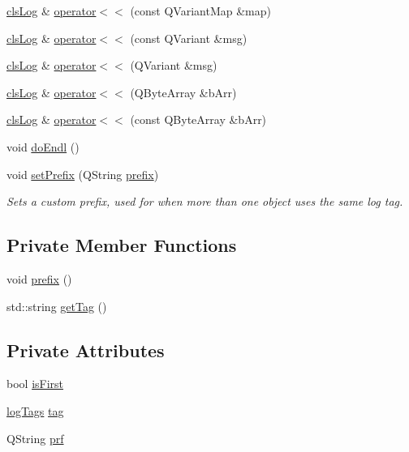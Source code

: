 \begin{DoxyCompactItemize}
\item 
\hyperlink{class_k4_u_1_1cls_log}{cls\-Log} \& \hyperlink{class_k4_u_1_1cls_log_ad3c6cb4ff134f40925f8d19177a461b6}{operator$<$$<$} (const Q\-Variant\-Map \&map)
\item 
\hyperlink{class_k4_u_1_1cls_log}{cls\-Log} \& \hyperlink{class_k4_u_1_1cls_log_a667d8d0b430593af7caf563410214187}{operator$<$$<$} (const Q\-Variant \&msg)
\item 
\hyperlink{class_k4_u_1_1cls_log}{cls\-Log} \& \hyperlink{class_k4_u_1_1cls_log_a99d9c23284e9bb462858f4d6ca33a93a}{operator$<$$<$} (Q\-Variant \&msg)
\item 
\hyperlink{class_k4_u_1_1cls_log}{cls\-Log} \& \hyperlink{class_k4_u_1_1cls_log_a265b09c82c550e8957f29724ec0d1198}{operator$<$$<$} (Q\-Byte\-Array \&b\-Arr)
\item 
\hyperlink{class_k4_u_1_1cls_log}{cls\-Log} \& \hyperlink{class_k4_u_1_1cls_log_a3efb08c54070b1bbd22e297e1b69e202}{operator$<$$<$} (const Q\-Byte\-Array \&b\-Arr)
\item 
void \hyperlink{class_k4_u_1_1cls_log_a81f179b2ccb3e2abeb9b47f5b83de935}{do\-Endl} ()
\item 
void \hyperlink{class_k4_u_1_1cls_log_acce6f46545b0de7dcc21b69dda54b246}{set\-Prefix} (Q\-String \hyperlink{class_k4_u_1_1cls_log_add7e9e8581a8d558c15c5f194dea4e5a}{prefix})
\begin{DoxyCompactList}\small\item\em Sets a custom prefix, used for when more than one object uses the same log tag. \end{DoxyCompactList}\end{DoxyCompactItemize}
\subsection*{Private Member Functions}
\begin{DoxyCompactItemize}
\item 
void \hyperlink{class_k4_u_1_1cls_log_add7e9e8581a8d558c15c5f194dea4e5a}{prefix} ()
\item 
std\-::string \hyperlink{class_k4_u_1_1cls_log_ad71c460835263e52b7c3d24063fa4ea0}{get\-Tag} ()
\end{DoxyCompactItemize}
\subsection*{Private Attributes}
\begin{DoxyCompactItemize}
\item 
bool \hyperlink{class_k4_u_1_1cls_log_aacbc8798b8923df2c0c45333f88b8c5a}{is\-First}
\item 
\hyperlink{namespace_k4_u_afd00b8cce0ab5037b155e37caed9a3a5}{log\-Tags} \hyperlink{class_k4_u_1_1cls_log_a5ccda7703f98df03a812bc5c6f51aae9}{tag}
\item 
Q\-String \hyperlink{class_k4_u_1_1cls_log_ae3b65749abbcf2a7bb5fa4edbd1702ad}{prf}
\end{DoxyCompactItemize}


